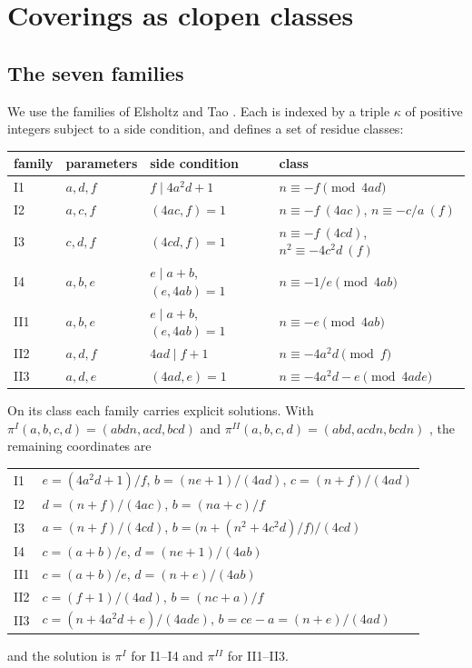 \documentclass[11pt,reqno]{amsart}
\theoremstyle{definition}
\begin{document}
\section{Coverings as clopen classes}\label{sec:frame}

\subsection{The seven families}
We use the families of Elsholtz and Tao \cite[Prop.~1.9]{ET}.  Each is
indexed by a triple $\kappa$ of positive integers subject to a side
condition, and defines a set of residue classes:
\begin{center}
\small\begin{tabular}{llll}
\toprule
family & parameters & side condition & class\\
\midrule
I1 & $a,d,f$ & $f\mid 4a^2d+1$ & $n\equiv-f \pmod{4ad}$\\
I2 & $a,c,f$ & $(4ac,f)=1$ & $n\equiv-f\ (4ac)$, $n\equiv -c/a\ (f)$\\
I3 & $c,d,f$ & $(4cd,f)=1$ & $n\equiv-f\ (4cd)$, $n^2\equiv-4c^2d\ (f)$\\
I4 & $a,b,e$ & $e\mid a+b$, $(e,4ab)=1$ & $n\equiv-1/e \pmod{4ab}$\\
II1 & $a,b,e$ & $e\mid a+b$, $(e,4ab)=1$ & $n\equiv-e\pmod{4ab}$\\
II2 & $a,d,f$ & $4ad\mid f+1$ & $n\equiv-4a^2d\pmod f$\\
II3 & $a,d,e$ & $(4ad,e)=1$ & $n\equiv-4a^2d-e\pmod{4ade}$\\
\bottomrule
\end{tabular}
\end{center}
On its class each family carries explicit solutions.  With
$\pi^{I}(a,b,c,d)=(abdn,acd,bcd)$ and $\pi^{II}(a,b,c,d)=(abd,acdn,bcdn)$
\cite[\S2]{ET}, the remaining coordinates are
\begin{center}
\begin{tabular}{ll}
\toprule
I1 & $e=(4a^2d+1)/f$, $b=(ne+1)/(4ad)$, $c=(n+f)/(4ad)$\\
I2 & $d=(n+f)/(4ac)$, $b=(na+c)/f$\\
I3 & $a=(n+f)/(4cd)$, $b=\bigl(n+(n^2+4c^2d)/f\bigr)/(4cd)$\\
I4 & $c=(a+b)/e$, $d=(ne+1)/(4ab)$\\
II1 & $c=(a+b)/e$, $d=(n+e)/(4ab)$\\
II2 & $c=(f+1)/(4ad)$, $b=(nc+a)/f$\\
II3 & $c=(n+4a^2d+e)/(4ade)$, $b=ce-a=(n+e)/(4ad)$\\
\bottomrule
\end{tabular}
\end{center}
and the solution is $\pi^I$ for I1--I4 and $\pi^{II}$ for II1--II3.
\end{document}
